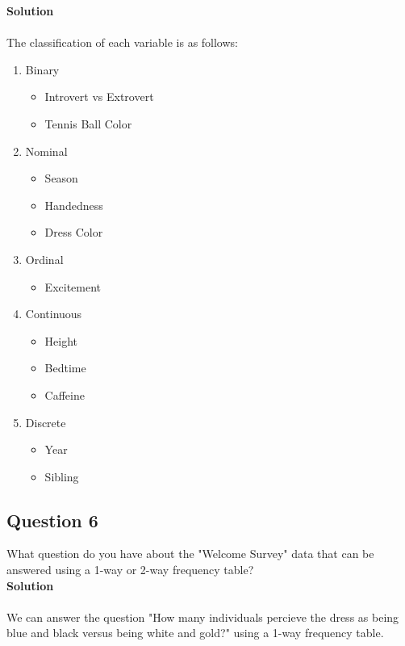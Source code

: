 \documentclass[12pt]{article}
\begin{document}
\textbf{Solution}\\ 
\\ 
The classification of each variable is as follows:\\ 
\begin{enumerate}
  \item Binary
    \begin{itemize}
      \item Introvert vs Extrovert
      \item Tennis Ball Color
    \end{itemize}
  \item Nominal
    \begin{itemize}
      \item Season
      \item Handedness
      \item Dress Color
    \end{itemize}
  \item Ordinal
    \begin{itemize}
      \item Excitement
    \end{itemize}
  \item Continuous
    \begin{itemize}
      \item Height
      \item Bedtime
      \item Caffeine
    \end{itemize}
  \item Discrete
    \begin{itemize}
      \item Year
      \item Sibling
    \end{itemize}
\end{enumerate}
\vspace{0.25in}
\subsection*{Question 6}
What question do you have about the "Welcome Survey" data that can be answered using a 1-way or 2-way frequency table?\\ 

\textbf{Solution}\\ 
\\ 
We can answer the question "How many individuals percieve the dress as being blue and black versus being white and gold?" using a 1-way frequency table. 
\vspace{0.25in}
\end{document}
